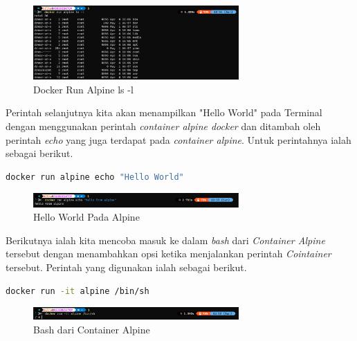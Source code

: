 \documentclass[11pt,a4paper]{article}
\begin{document}
    \begin{figure}[h]
        \centering
        \includegraphics[width = 0.7\textwidth]{Figures/docker-run alpine ls -l.png}
        \caption{Docker Run Alpine ls -l}
    \end{figure}

    Perintah selanjutnya kita akan menampilkan "Hello World" pada Terminal dengan menggunakan perintah 
    \textit{container alpine docker} dan ditambah oleh perintah \textit{echo} yang juga terdapat pada 
    \textit{container alpine}. Untuk perintahnya ialah sebagai berikut.
    \begin{lstlisting}[language=bash]
        docker run alpine echo "Hello World"
    \end{lstlisting}

    \begin{figure}[h]
        \centering
        \includegraphics[width = 0.7\textwidth]{Figures/hello_from_alpine.png}
        \caption{Hello World Pada Alpine}
    \end{figure}

    \newpage
    Berikutnya ialah kita mencoba masuk ke dalam \textit{bash} dari \textit{Container Alpine} tersebut dengan menambahkan 
    opsi ketika menjalankan perintah \textit{Cointainer} tersebut. Perintah yang digunakan ialah sebagai berikut.
    \begin{lstlisting}[language=bash]
        docker run -it alpine /bin/sh
    \end{lstlisting}
    \begin{figure}[h]
        \centering
        \includegraphics[width = 0.7\textwidth]{Figures/bin-sh.png}
        \caption{Bash dari Container Alpine}
    \end{figure}
\end{document}
